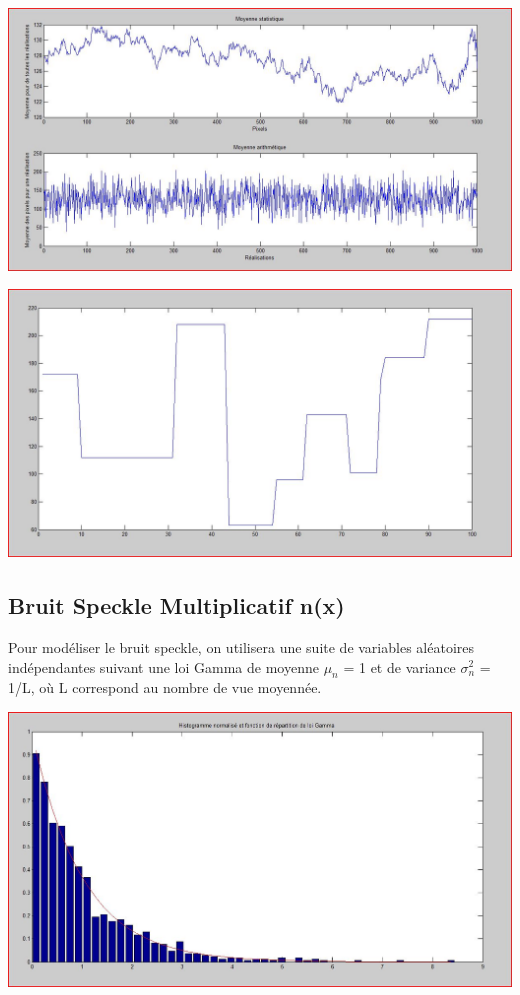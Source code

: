 \documentclass[a4paper,11pt]{article}
\newcommand{\FSource}[1]{%
  
  }
\begin{document}
\vspace{0.5cm}

\FSource{matlab/1.m}

\vspace{0.5cm}

\includegraphics[width=15cm]{capture/ergo.JPG}

\includegraphics[width=15cm]{capture/Capturer.JPG}

\subsection{Bruit Speckle Multiplicatif n(x)}

Pour modéliser le bruit speckle, on utilisera une suite de variables aléatoires indépendantes suivant une loi Gamma de moyenne $\mu_n$ = 1 et de variance $\sigma_n^2$ = 1/L, où L correspond au nombre de vue moyennée.

\vspace{0.5cm}

\FSource{matlab/2.m}

\vspace{0.5cm}

\includegraphics[width=15cm]{capture/bruit.JPG}
\end{document}
